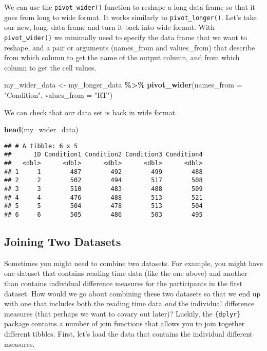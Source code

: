 \documentclass[
]{book}
\newenvironment{Shaded}{\begin{snugshade}}{\end{snugshade}}
\newcommand{\AttributeTok}[1]{\textcolor[rgb]{0.13,0.29,0.53}{#1}}
\newcommand{\FunctionTok}[1]{\textcolor[rgb]{0.13,0.29,0.53}{\textbf{#1}}}
\newcommand{\NormalTok}[1]{#1}
\newcommand{\OtherTok}[1]{\textcolor[rgb]{0.56,0.35,0.01}{#1}}
\newcommand{\SpecialCharTok}[1]{\textcolor[rgb]{0.81,0.36,0.00}{\textbf{#1}}}
\newcommand{\StringTok}[1]{\textcolor[rgb]{0.31,0.60,0.02}{#1}}
\begin{document}
We can use the \texttt{pivot\_wider()} function to reshape a long data frame so that it goes from long to wide format. It works similarly to \texttt{pivot\_longer()}. Let's take our new, long, data frame and turn it back into wide format. With \texttt{pivot\_wider()} we minimally need to specify the data frame that we want to reshape, and a pair or arguments (names\_from and values\_from) that describe from which column to get the name of the output column, and from which column to get the cell values.

\begin{Shaded}
\begin{Highlighting}[]
\NormalTok{my\_wider\_data }\OtherTok{\textless{}{-}}\NormalTok{ my\_longer\_data }\SpecialCharTok{\%\textgreater{}\%}
  \FunctionTok{pivot\_wider}\NormalTok{(}\AttributeTok{names\_from =} \StringTok{"Condition"}\NormalTok{, }
              \AttributeTok{values\_from =} \StringTok{"RT"}\NormalTok{)}
\end{Highlighting}
\end{Shaded}

We can check that our data set is back in wide format.

\begin{Shaded}
\begin{Highlighting}[]
\FunctionTok{head}\NormalTok{(my\_wider\_data)}
\end{Highlighting}
\end{Shaded}

\begin{verbatim}
## # A tibble: 6 x 5
##      ID Condition1 Condition2 Condition3 Condition4
##   <dbl>      <dbl>      <dbl>      <dbl>      <dbl>
## 1     1        487        492        499        488
## 2     2        502        494        517        508
## 3     3        510        483        488        509
## 4     4        476        488        513        521
## 5     5        504        478        513        504
## 6     6        505        486        503        495
\end{verbatim}

\hypertarget{joining-two-datasets}{%
\subsection{Joining Two Datasets}\label{joining-two-datasets}}

Sometimes you might need to combine two datasets. For example, you might have one dataset that contains reading time data (like the one above) and another than contains individual difference measures for the participants in the first dataset. How would we go about combining these two datasets so that we end up with one that includes both the reading time data \emph{and} the individual difference measures (that perhaps we want to covary out later)? Luckily, the \texttt{\{dplyr\}} package contains a number of join functions that allows you to join together different tibbles. First, let's load the data that contains the individual different measures.
\end{document}
